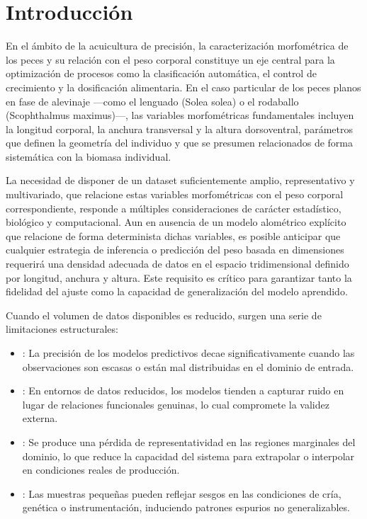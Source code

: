 \documentclass[a4paper,10pt,spanish]{jupyterBook}
\begin{document}
\section{Introducción}
\label{\detokenize{content/02/Generador:introduccion}}
\sphinxAtStartPar
En el ámbito de la acuicultura de precisión, la caracterización morfométrica de los peces y su relación con el peso corporal constituye un eje central para la optimización de procesos como la clasificación automática, el control de crecimiento y la dosificación alimentaria. En el caso particular de los peces planos en fase de alevinaje —como el lenguado (Solea solea) o el rodaballo (Scophthalmus maximus)—, las variables morfométricas fundamentales incluyen la longitud corporal, la anchura transversal y la altura dorso\sphinxhyphen{}ventral, parámetros que definen la geometría del individuo y que se presumen relacionados de forma sistemática con la biomasa individual.

\sphinxAtStartPar
La necesidad de disponer de un dataset suficientemente amplio, representativo y multivariado, que relacione estas variables morfométricas con el peso corporal correspondiente, responde a múltiples consideraciones de carácter estadístico, biológico y computacional. Aun en ausencia de un modelo alométrico explícito que relacione de forma determinista dichas variables, es posible anticipar que cualquier estrategia de inferencia o predicción del peso basada en dimensiones requerirá una densidad adecuada de datos en el espacio tridimensional definido por longitud, anchura y altura. Este requisito es crítico para garantizar tanto la fidelidad del ajuste como la capacidad de generalización del modelo aprendido.

\sphinxAtStartPar
Cuando el volumen de datos disponibles es reducido, surgen una serie de limitaciones estructurales:
\begin{itemize}
\item {}
\sphinxAtStartPar
{}: La precisión de los modelos predictivos decae significativamente cuando las observaciones son escasas o están mal distribuidas en el dominio de entrada.

\item {}
\sphinxAtStartPar
{}: En entornos de datos reducidos, los modelos tienden a capturar ruido en lugar de relaciones funcionales genuinas, lo cual compromete la validez externa.

\item {}
\sphinxAtStartPar
{}: Se produce una pérdida de representatividad en las regiones marginales del dominio, lo que reduce la capacidad del sistema para extrapolar o interpolar en condiciones reales de producción.

\item {}
\sphinxAtStartPar
{}: Las muestras pequeñas pueden reflejar sesgos en las condiciones de cría, genética o instrumentación, induciendo patrones espurios no generalizables.

\end{itemize}
\end{document}
